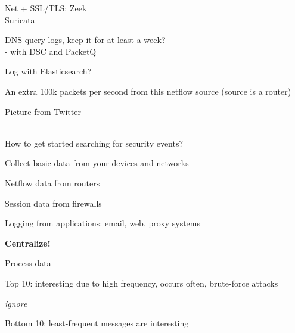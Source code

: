 \documentclass[Screen16to9,17pt]{foils}
\begin{document}


\begin{list2}
\item Net + SSL/TLS: Zeek  \\Suricata {}
\item DNS query logs, keep it for at least a week?\\
- with DSC and PacketQ 
\item Log with Elasticsearch?\\
{\footnotesize{}}
\end{list2}



\centerline{An extra 100k packets per second from this netflow source (source is a router)}









Picture from Twitter\\
\\




\begin{list1}
\item How to get started searching for security events?
\item Collect basic data from your devices and networks

\begin{list2}
\item Netflow data from routers
\item Session data from firewalls
\item Logging from applications: email, web, proxy systems
\end{list2}
\item {\bf Centralize!}
\item Process data
\begin{list2}
\item Top 10: interesting due to high frequency, occurs often, brute-force attacks
\item {\it ignore}
\item Bottom 10: least-frequent messages are interesting
\end{list2}
\end{list1}
\end{document}
